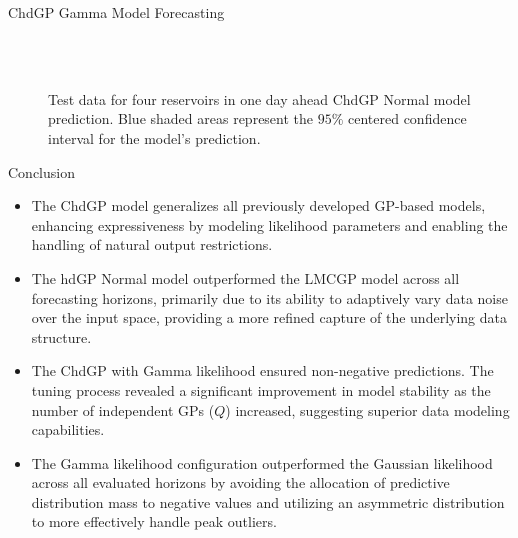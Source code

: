 \begin{frame}{ChdGP Gamma Model Forecasting}
	\centering
	\begin{figure}[htbp]
		\tiny
		\setlength{} 
		\setlength{}
		
		\subfloat[$T.$]{}\hfill
		\subfloat[$A.$]{}\\[-0.5cm]
		\subfloat[$I.$]{}\hfill
		\subfloat[$O.$]{}\\[-0.4cm]
		
		\caption{Test data for four reservoirs in one day ahead ChdGP Normal model prediction. Blue shaded areas represent the $95\%$ centered confidence interval for the model's prediction.}
	\end{figure}
\end{frame}

\begin{frame}{Conclusion}
	
	\begin{itemize}
		\justifying
		\item The ChdGP model generalizes all previously developed GP-based models, enhancing expressiveness by modeling likelihood parameters and enabling the handling of natural output restrictions.
		
		\item The hdGP Normal model outperformed the LMCGP model across all forecasting horizons, primarily due to its ability to adaptively vary data noise over the input space, providing a more refined capture of the underlying data structure.
		
		\item The ChdGP with Gamma likelihood ensured non-negative predictions. The tuning process revealed a significant improvement in model stability as the number of independent GPs ($Q$) increased, suggesting superior data modeling capabilities.
		
		\item The Gamma likelihood configuration outperformed the Gaussian likelihood across all evaluated horizons by avoiding the allocation of predictive distribution mass to negative values and utilizing an asymmetric distribution to more effectively handle peak outliers.
		
	\end{itemize}
\end{frame}

